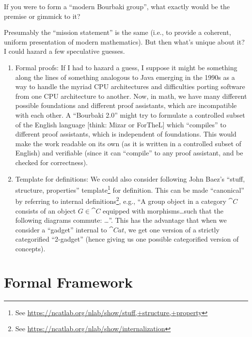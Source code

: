 \begin{puzzle}[{``Bourbaki 2.0''}]
If you were to form a ``modern Bourbaki group'', what exactly would be
the premise or gimmick to it?

Presumably the ``mission statement'' is the same (i.e., to provide a
coherent, uniform presentation of modern mathematics). But then what's
unique about it? I could hazard a few speculative guesses.

\begin{enumerate}
\item Formal proofs: If I had to hazard a guess, I suppose it might be something along the
lines of something analogous to Java emerging in the 1990s as a way to
handle the myriad CPU architectures and difficulties porting software
from one CPU architecture to another. Now, in math, we have many
different possible foundations and different proof assistants, which are
incompatible with each other. A ``Bourbaki 2.0'' might try to formulate
a controlled subset of the English language [think: Mizar or ForTheL]
which ``compiles'' to different proof assistants, which is independent
of foundations. This would make the work readable on its own (as it is
written in a controlled subset of English) and verifiable (since it can
``compile'' to any proof assistant, and be checked for correctness).

\item Template for definitions:
  We could also consider following John Baez's ``stuff, structure,
properties'' template\footnote{See \url{https://ncatlab.org/nlab/show/stuff,+structure,+property}} for definition. This can be made ``canonical'' by
referring to internal definitions\footnote{See \url{https://ncatlab.org/nlab/show/internalization}},
e.g., ``A group object in a category $\cat{C}$ consists of an object
$G\in\cat{C}$ equipped with morphisms\dots such that the following
diagrams commute: \dots''. This has the advantage that when we consider
a ``gadget'' internal to $\cat{Cat}$, we get one version of a strictly
categorified ``2-gadget'' (hence giving us one possible categorified
version of concepts).
\end{enumerate}
\end{puzzle}

\section{Formal Framework}

